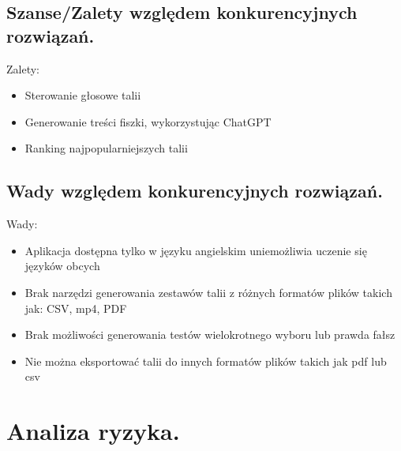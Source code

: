 \subsection{Szanse/Zalety względem konkurencyjnych rozwiązań.}

Zalety:
\begin{itemize}[label=-]
    \item Sterowanie głosowe talii
    \item Generowanie treści fiszki, wykorzystując ChatGPT
    \item Ranking najpopularniejszych talii
    \end{itemize}

\subsection{Wady względem konkurencyjnych rozwiązań.}

Wady:
\begin{itemize}[label=-]
    \item Aplikacja dostępna tylko w języku angielskim uniemożliwia uczenie się języków obcych
    \item Brak narzędzi generowania zestawów talii z różnych formatów plików takich jak: CSV, mp4, PDF
    \item Brak możliwości generowania testów wielokrotnego wyboru lub prawda fałsz
    \item Nie można eksportować talii do innych formatów plików takich jak pdf lub csv
    \end{itemize}

\section{Analiza ryzyka.}


